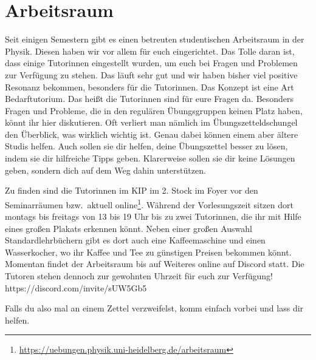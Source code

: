 \section{Arbeitsraum}
\label{sec:arbeitsraum}
Seit einigen Semestern gibt es einen betreuten studentischen Arbeitsraum in der Physik. Diesen haben wir vor allem für euch eingerichtet. Das Tolle daran ist, dass einige Tutorinnen eingestellt wurden, um euch bei Fragen und Problemen zur Verfügung zu stehen. Das läuft sehr gut und wir haben bisher viel positive Resonanz bekommen, besonders für die Tutorinnen. Das Konzept ist eine Art Bedarftutorium. Das heißt die Tutorinnen sind für eure Fragen da. Besonders Fragen und Probleme, die in den regulären Übungsgruppen keinen Platz haben, könnt ihr hier diskutieren. Oft verliert man nämlich im Übungszetteldschungel den Überblick, was wirklich wichtig ist. Genau dabei können einem aber ältere Studis helfen. Auch sollen sie dir helfen, deine Übungszettel besser zu lösen, indem sie dir hilfreiche Tipps geben. Klarerweise sollen sie dir keine Lösungen geben, sondern dich auf dem Weg dahin unterstützen.

Zu finden sind die Tutorinnen im \gls{KIP} im 2. Stock im Foyer vor den Seminarräumen bzw.\, aktuell online\footnote{\url{https://uebungen.physik.uni-heidelberg.de/arbeitsraum}}. Während der Vorlesungszeit sitzen dort montags bis freitags von 13 bis 19 Uhr bis zu zwei Tutorinnen, die ihr mit Hilfe eines großen Plakats erkennen könnt. Neben einer großen Auswahl Standardlehrbüchern gibt es dort auch eine Kaffeemaschine und einen Wasserkocher, wo ihr Kaffee und Tee zu günstigen Preisen bekommen könnt. Momentan findet der Arbeitsraum bis auf Weiteres online auf Discord statt. Die Tutoren stehen dennoch zur gewohnten Uhrzeit für euch zur Verfügung!
https://discord.com/invite/sUW5Gb5

Falls du also mal an einem Zettel verzweifelst, komm einfach vorbei und lass dir helfen.
